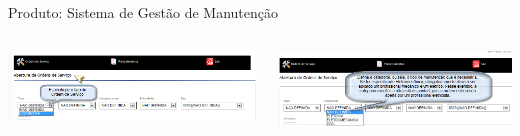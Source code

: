 \begin{frame}{Produto: Sistema de Gestão de Manutenção}
	\begin{columns}
		\begin{column}{0.45\textwidth}
			\includegraphics[width=1\textwidth]{imagens/sgm-03}
		\end{column}
		\begin{column}{0.45\textwidth}
			\includegraphics[width=1\textwidth]{imagens/sgm-04}
		\end{column}
	\end{columns}
	
	\framebreak
	

\end{frame}
